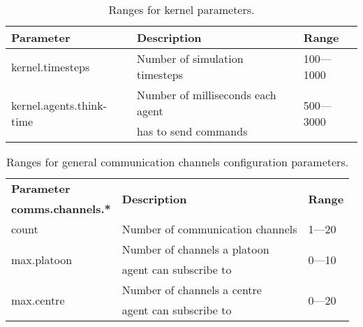 \documentclass{article}
\begin{document}
\begin{table}[htb]
\caption{Ranges for kernel parameters.}
\label{tab:3}
\centering
\begin{tabular}{lll}
  \hline
  \textbf{Parameter}                        & \textbf{Description}              & \textbf{Range}\\
  \hline
  kernel.timesteps                          & Number of simulation timesteps    & 100---1000\\
  \hline
  \multirow{2}{*}{kernel.agents.think-time} & Number of milliseconds each agent & \multirow{2}{*}{500---3000}\\
                                            & has to send commands
                                            & \\
  \hline
\end{tabular}
\end{table}

\begin{table}[htb]
\caption{Ranges for general communication channels configuration parameters.}
\label{tab:4}
\centering
\begin{tabular}{lll}
  \hline
  \textbf{Parameter}            & \multirow{2}{*}{\textbf{Description}} &\multirow{2}{*}{\textbf{Range}}\\
  \textbf{comms.channels.*}     &                                       & \\
  \hline
  count                         & Number of communication channels      & 1---20\\
  \hline
  \multirow{2}{*}{max.platoon}  & Number of channels a platoon          & \multirow{2}{*}{0---10}\\
                                & agent can subscribe to                & \\
  \hline
  \multirow{2}{*}{max.centre}   & Number of channels a centre           & \multirow{2}{*}{0---20}\\
                                & agent can subscribe to                & \\
  \hline
\end{tabular}
\end{table}
\end{document}
